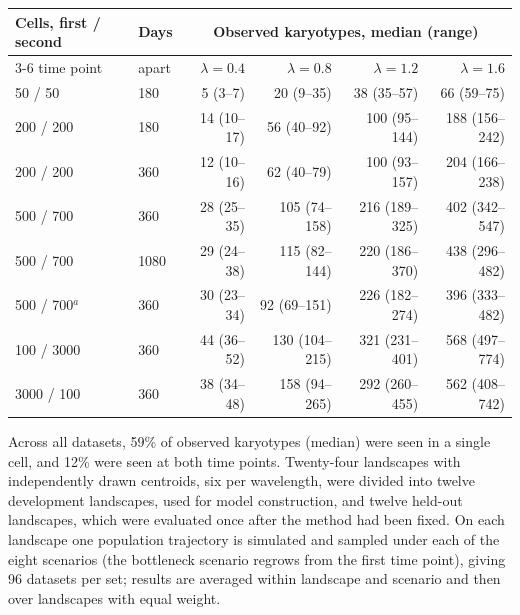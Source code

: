 \documentclass[11pt]{article}
\begin{document}
\begin{center}
\footnotesize
\begin{tabular}{llrrrr}
\toprule
Cells, first / second & Days & \multicolumn{4}{c}{Observed karyotypes, median (range)} \\
\cmidrule(lr){3-6}
time point & apart & $\lambda=0.4$ & $\lambda=0.8$ & $\lambda=1.2$ & $\lambda=1.6$ \\
\midrule
50 / 50 & 180 & 5 (3--7) & 20 (9--35) & 38 (35--57) & 66 (59--75) \\
200 / 200 & 180 & 14 (10--17) & 56 (40--92) & 100 (95--144) & 188 (156--242) \\
200 / 200 & 360 & 12 (10--16) & 62 (40--79) & 100 (93--157) & 204 (166--238) \\
500 / 700 & 360 & 28 (25--35) & 105 (74--158) & 216 (189--325) & 402 (342--547) \\
500 / 700 & 1080 & 29 (24--38) & 115 (82--144) & 220 (186--370) & 438 (296--482) \\
500 / 700$^{a}$ & 360 & 30 (23--34) & 92 (69--151) & 226 (182--274) & 396 (333--482) \\
100 / 3000 & 360 & 44 (36--52) & 130 (104--215) & 321 (231--401) & 568 (497--774) \\
3000 / 100 & 360 & 38 (34--48) & 158 (94--265) & 292 (260--455) & 562 (408--742) \\
\bottomrule
\end{tabular}
\end{center}


\noindent Across all datasets, 59\% of observed karyotypes (median) were seen
in a single cell, and 12\% were seen at both time points. Twenty-four
landscapes with independently drawn centroids, six per wavelength, were
divided into twelve development landscapes, used for model construction, and
twelve held-out landscapes, which were evaluated once after the method had
been fixed. On each landscape one population trajectory is simulated and
sampled under each of the eight scenarios (the bottleneck scenario regrows
from the first time point), giving 96 datasets per set; results are averaged
within landscape and scenario and then over landscapes with equal weight.
\end{document}
